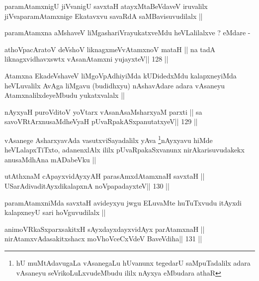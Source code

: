 \begin{artha}
paramAtamxnigU jiVvanigU savxtaH atayxMtaBeVdaveV iruvalilx
jiVvaparamAtamxnige Ekatavxvu savaRdA saMBavisuvudilalx ||

paramAtamxna aMshaveV liMgashariVrayukatxveMdu heVLalilalxve ? eMdare -
\end{artha}

\begin{shl}
athoVpacAratoV deVshoV liknagxmeVvA\s\s tamxnoV mataH ||
na tadA liknagxvidhavxswtx vAsanA\s\s tamxni yujayxteV\hfill || 128 ||
\end{shl}

\begin{artha}
Atamxna EkadeVshaveV liMgoVpAdhiyiMda kUDidedxMdu kalapxneyiMda
heVLuvalilx AvAga liMgavu (budidhxyu) nAshavAdare adara vAsaneyu
AtamxnalilxdeyeMbudu yukatxvalalx ||
\end{artha}

\begin{shl}
nAyxyaH puroVditoV yoV\s tarx vAsanAsaMsharxyaM parxti ||
sa savoVR\s tArxnusaMdheVyaH pUvaRpakASxpanutatxyeV\hfill || 129 ||
\end{shl}

\begin{artha}
vAsanege AsharxyavAda vasutxviSayadalilx yAva \footnote[1]{hU
  muMtAdavugaLa vAsanegaLu hUvanunx tegedarU saMpuTadalilx
  adara vAsaneyu seVrikoLuLxvudeMbudu ililx nAyxya eMbudara athaR}nAyxyavu
hiMde heVLalapxTiTxto, adanenxlAlx ililx pUvaRpakaSxvanunx
nirAkarisuvudakekx anusaMdhAna mADabeVku ||
\end{artha}


\begin{shl}
utAthxnaM cApayxvidAyxyAH parasAmxdAtamxnaH savxtaH ||
USarAdivaditAyxdikalapxnA noVpapadayxteV\hfill || 130 ||
\end{shl}

\begin{artha}
paramAtamxniMda savxtaH avideyxyu jwgu ELuvaMte huTuTxvudu
itAyxdi kalapxneyU sari hoVguvudilalx ||
\end{artha}

\begin{shl}
animoVRkaSxparxsakitxH sAyxdayxdayxvidAyx parAtamxnaH ||
nirAtamxvAdasakitxshacx moVhoVceCxVdeV BaveVdiha\hfill || 131 ||
\end{shl}

